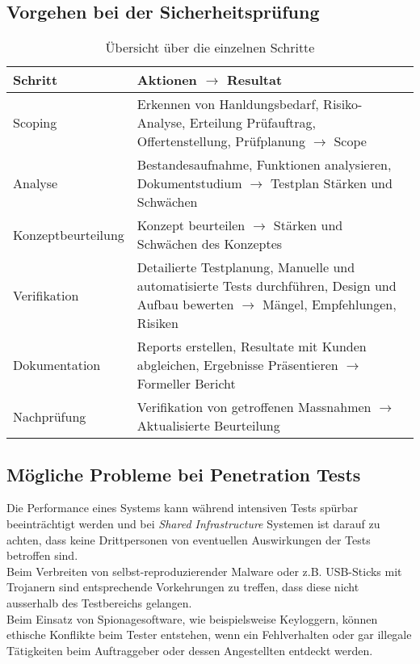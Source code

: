 \subsection{Vorgehen bei der Sicherheitsprüfung}
\begin{table}[H]
	\begin{tabularx}{\textwidth}{l|X}
		\textbf{Schritt} & \textbf{Aktionen $ \rightarrow $ Resultat}\\ \hline
		Scoping & Erkennen von Hanldungsbedarf, Risiko-Analyse, Erteilung Prüfauftrag, Offertenstellung, Prüfplanung $ \rightarrow $ Scope\\ \hline
		Analyse & Bestandesaufnahme, Funktionen analysieren, Dokumentstudium $ \rightarrow $ Testplan Stärken und Schwächen\\ \hline
		Konzeptbeurteilung & Konzept beurteilen $ \rightarrow $ Stärken und Schwächen des Konzeptes\\ \hline
		Verifikation & Detailierte Testplanung, Manuelle und automatisierte Tests durchführen, Design und Aufbau bewerten $ \rightarrow $ Mängel, Empfehlungen, Risiken\\ \hline
		Dokumentation & Reports erstellen, Resultate mit Kunden abgleichen, Ergebnisse Präsentieren $ \rightarrow $ Formeller Bericht\\ \hline
		Nachprüfung & Verifikation von getroffenen Massnahmen $ \rightarrow $ Aktualisierte Beurteilung\\ \hline
	\end{tabularx}
	\caption{Übersicht über die einzelnen Schritte}
\end{table}

\subsection{Mögliche Probleme bei Penetration Tests}
Die Performance eines Systems kann während intensiven Tests spürbar beeinträchtigt werden und bei \textit{Shared Infrastructure} Systemen ist darauf zu achten, dass keine Drittpersonen von eventuellen Auswirkungen der Tests betroffen sind.\\

Beim Verbreiten von selbst-reproduzierender Malware oder z.B. USB-Sticks mit Trojanern sind entsprechende Vorkehrungen zu treffen, dass diese nicht ausserhalb des Testbereichs gelangen.\\

Beim Einsatz von Spionagesoftware, wie beispielsweise Keyloggern, können ethische Konflikte beim Tester entstehen, wenn ein Fehlverhalten oder gar illegale Tätigkeiten beim Auftraggeber oder dessen Angestellten entdeckt werden.
